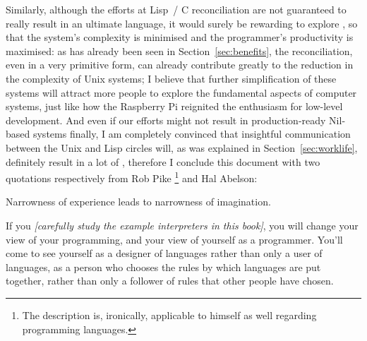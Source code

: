 Similarly, although the efforts at Lisp~/ C reconciliation are not guaranteed
to really result in an ultimate language, it would surely be rewarding to
explore , so that the
system's complexity is minimised and the programmer's productivity is maximised:
as has already been seen in Section~\ref{sec:benefits}, the reconciliation, even
in a very primitive form, can already contribute greatly to the reduction in the
complexity of Unix systems; I believe that further simplification of these
systems will attract more people to explore the fundamental aspects of computer
systems, just like how the Raspberry Pi reignited the enthusiasm for low-level
development.  And even if our efforts might not result in production-ready
Nil-based systems finally, I am completely convinced that insightful
communication between the Unix and Lisp circles will, as was explained in
Section~\ref{sec:worklife}, definitely result in a lot of , therefore I conclude this document
with two quotations respectively from Rob Pike%
\footnote{The description is, ironically, applicable to himself as well
regarding programming languages.} and Hal Abelson:
\begin{quoting}
	Narrowness of experience leads to narrowness of imagination.
\end{quoting}
\colskipc
\begin{quoting}
	If you \emph{[carefully study the example interpreters in this book]},
	you will change your view of your programming, and your view of
	yourself as a programmer.  You'll come to see yourself as a designer
	of languages rather than only a user of languages, as a person
	who chooses the rules by which languages are put together, rather
	than only a follower of rules that other people have chosen.
\end{quoting}

